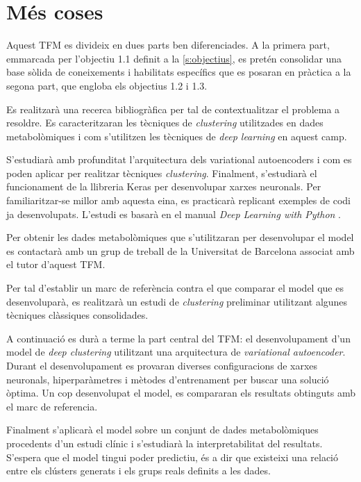 \documentclass[CAT,BIB]{TFUOC}%
\begin{document}
    \section{Més coses}
    \label{s:mes}

    Aquest TFM es divideix en dues parts ben diferenciades. A la primera part, emmarcada per l'objectiu 1.1 definit a la \cref{s:objectius}, es pretén consolidar una base sòlida de coneixements i habilitats específics que es posaran en pràctica a la segona part, que engloba els objectius 1.2 i 1.3.

    Es realitzarà una recerca bibliogràfica per tal de contextualitzar el problema a resoldre. Es caracteritzaran les tècniques de \textit{clustering} utilitzades en dades metabolòmiques i com s'utilitzen les tècniques de \textit{deep learning} en aquest camp.

    S'estudiarà amb profunditat l'arquitectura dels variational autoencoders i com es poden aplicar per realitzar tècniques \textit{clustering}. Finalment, s'estudiarà el funcionament de la llibreria Keras per desenvolupar xarxes neuronals. Per familiaritzar-se millor amb aquesta eina, es practicarà replicant exemples de codi ja desenvolupats. L'estudi es basarà en el manual \textit{Deep Learning with Python} \citep{Ketkar2021}.

    Per obtenir les dades metabolòmiques que s'utilitzaran per desenvolupar el model es contactarà amb un grup de treball de la Universitat de Barcelona associat amb el tutor d'aquest TFM.

    Per tal d'establir un marc de referència contra el que comparar el model que es desenvoluparà, es realitzarà un estudi de \textit{clustering} preliminar utilitzant algunes tècniques clàssiques consolidades.

    A continuació es durà a terme la part central del TFM: el desenvolupament d'un model de \textit{deep clustering} utilitzant una arquitectura de \textit{variational autoencoder}. Durant el desenvolupament es provaran diverses configuracions de xarxes neuronals, hiperparàmetres i mètodes d'entrenament per buscar una solució òptima. Un cop desenvolupat el model, es compararan els resultats obtinguts amb el marc de referencia.

    Finalment s'aplicarà el model sobre un conjunt de dades metabolòmiques procedents d'un estudi clínic i s'estudiarà la interpretabilitat del resultats. S'espera que el model tingui poder predictiu, és a dir que existeixi una relació entre els clústers generats i els grups reals definits a les dades.
\end{document}
